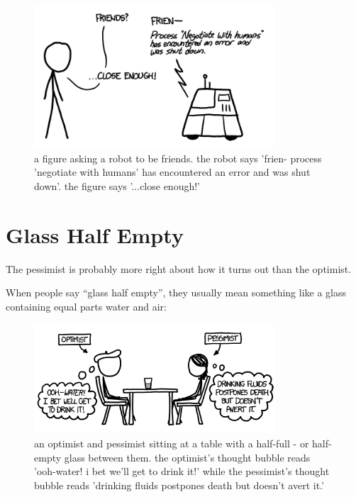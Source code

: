 \begin{figure}[!htbp]
\centering
\includegraphics[scale=0.5, max width=0.8\textwidth]{imgs/a/5/robot_apocalypse_end.png}
\caption{a figure asking a robot to be friends. the robot says 'frien- process 'negotiate with humans' has encountered an error and was shut down'. the figure says '...close enough!'}
\end{figure}

{
\chapter{Glass Half Empty}
}

\hfill{}

{The pessimist is probably more right about how it turns out than the optimist.}

{When people say “glass half empty”, they usually mean something like a glass containing equal parts water and air:}

\begin{figure}[!htbp]
\centering
\includegraphics[scale=0.5, max width=0.8\textwidth]{imgs/a/6/glass_people.png}
\caption{an optimist and pessimist sitting at a table with a half-full - or half-empty glass between them. the optimist's thought bubble reads 'ooh-water! i bet we'll get to drink it!' while the pessimist's thought bubble reads 'drinking fluids postpones death but doesn't avert it.'}
\end{figure}

